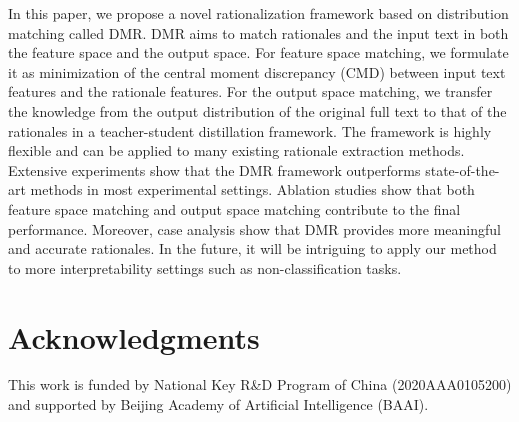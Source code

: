 \documentclass[letterpaper]{article} %
\begin{document}
In this paper, we propose a novel rationalization framework based on distribution matching called DMR. DMR aims to match rationales and the input text in both the feature space and the output space. 
For feature space matching, we formulate it as minimization of the central moment discrepancy (CMD) between input text features and the rationale features. For the output space matching, we transfer the knowledge from the output distribution of the original full text to that of the rationales in a teacher-student distillation framework.
The framework is highly flexible and can be applied to many existing rationale extraction methods. Extensive experiments show that the DMR framework outperforms state-of-the-art methods in most experimental settings.
Ablation studies show that both feature space matching and output space matching contribute to the final performance.
Moreover, case analysis show that DMR provides more meaningful and accurate rationales. In the future, it will be intriguing to apply our method to more interpretability settings such as non-classification tasks.


\section{Acknowledgments}
This work is funded by National Key R\&D Program of China (2020AAA0105200) and supported by Beijing Academy of Artificial Intelligence (BAAI).


% 
\end{document}
